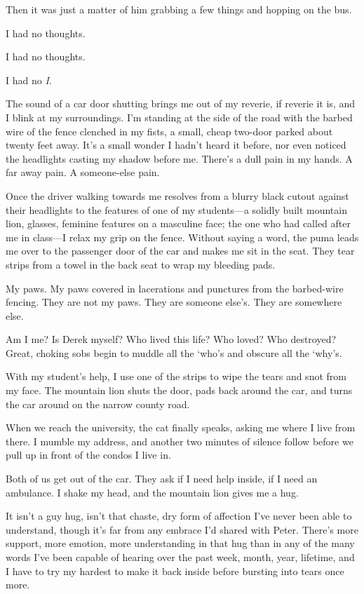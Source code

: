 Then it was just a matter of him grabbing a few things and hopping on the bus.

I had no thoughts.

I had no thoughts.

I had no \emph{I}.

\secdiv{}

\noindent The sound of a car door shutting brings me out of my reverie, if reverie it is, and I blink at my surroundings. I'm standing at the side of the road with the barbed wire of the fence clenched in my fists, a small, cheap two-door parked about twenty feet away. It's a small wonder I hadn't heard it before, nor even noticed the headlights casting my shadow before me. There's a dull pain in my hands. A far away pain. A someone-else pain.

Once the driver walking towards me resolves from a blurry black cutout against their headlights to the features of one of my students---a solidly built mountain lion, glasses, feminine features on a masculine face; the one who had called after me in class---I relax my grip on the fence. Without saying a word, the puma leads me over to the passenger door of the car and makes me sit in the seat. They tear strips from a towel in the back seat to wrap my bleeding pads.

My paws. My paws covered in lacerations and punctures from the barbed-wire fencing. They are not my paws. They are someone else's. They are somewhere else.

Am I me? Is Derek myself? Who lived this life? Who loved? Who destroyed? Great, choking sobs begin to muddle all the `who's and obscure all the `why's.

With my student's help, I use one of the strips to wipe the tears and snot from my face. The mountain lion shuts the door, pads back around the car, and turns the car around on the narrow county road.

When we reach the university, the cat finally speaks, asking me where I live from there. I mumble my address, and another two minutes of silence follow before we pull up in front of the condos I live in.

Both of us get out of the car. They ask if I need help inside, if I need an ambulance. I shake my head, and the mountain lion gives me a hug.

It isn't a guy hug, isn't that chaste, dry form of affection I've never been able to understand, though it's far from any embrace I'd shared with Peter. There's more support, more emotion, more understanding in that hug than in any of the many words I've been capable of hearing over the past week, month, year, lifetime, and I have to try my hardest to make it back inside before bursting into tears once more.

